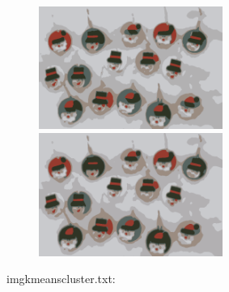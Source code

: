 \begin{center}
\begin{figure}[H]
\centering\includegraphics[width=6cm]{./imgkmeanscluster06-04.png}
\centering\includegraphics[width=6cm]{./imgkmeanscluster06-05.png}\\
\end{figure}
\end{center}

imgkmeanscluster.txt:\\
\begin{scriptsize}
\begin{ttfamily}

\end{ttfamily}
\end{scriptsize}
